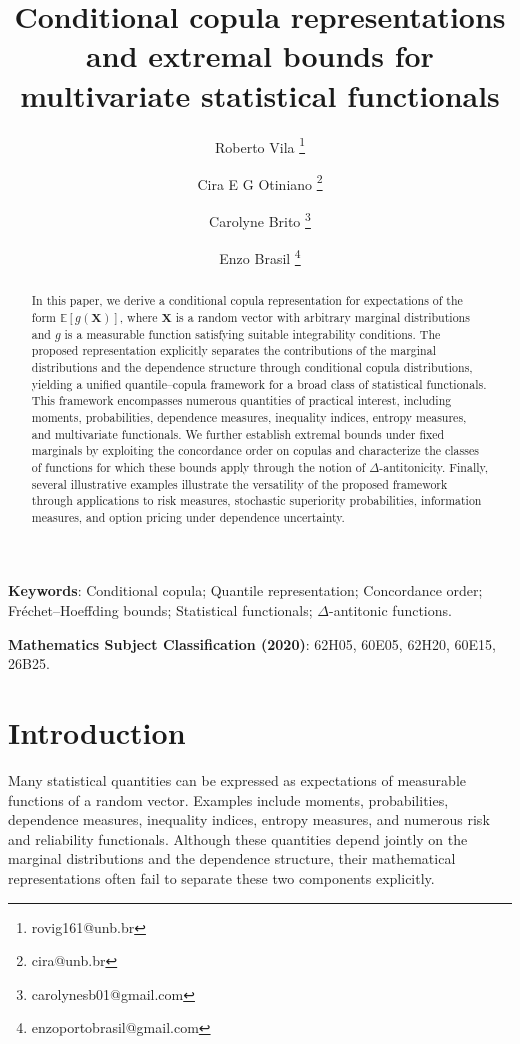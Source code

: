 \documentclass[12pt]{article}
\title{\bf Conditional copula representations and extremal bounds for multivariate statistical functionals}
\author[1] { Roberto Vila \thanks{rovig161@unb.br }}
\author[1]{Cira E G Otiniano \thanks{cira@unb.br }}
\author[1]{Carolyne Brito  \thanks{carolynesb01@gmail.com}}
\author[1]{Enzo Brasil  \thanks{enzoportobrasil@gmail.com}}
\affil[1]{\normalfont 
 	Department of Statistics, University of
 	Bras\'ilia, Bras\'ilia, 70.910-900, Brazil}
\begin{document}
\maketitle
\begin{abstract}
In this paper, we derive a conditional copula representation for expectations of the form $\mathbb{E}[g(\boldsymbol{X})]$, where $\boldsymbol{X}$ is a random vector with arbitrary marginal distributions and $g$ is a measurable function satisfying suitable integrability conditions. The proposed representation explicitly separates the contributions of the marginal distributions and the dependence structure through conditional copula distributions, yielding a unified quantile--copula framework for a broad class of statistical functionals. This framework encompasses numerous quantities of practical interest, including moments, probabilities, dependence measures, inequality indices, entropy measures, and multivariate functionals. We further establish extremal bounds under fixed marginals by exploiting the concordance order on copulas and characterize the classes of functions for which these bounds apply through the notion of $\Delta$-antitonicity. Finally, several illustrative examples illustrate the versatility of the proposed framework through applications to risk measures, stochastic superiority probabilities, information measures, and option pricing under dependence uncertainty.
\end{abstract}
\textbf{Keywords}: Conditional copula;
Quantile representation;
Concordance order;
Fréchet--Hoeffding bounds;
Statistical functionals;
$\Delta$-antitonic functions.

\noindent
\textbf{Mathematics Subject Classification (2020)}: 62H05,
60E05,
62H20,
60E15,
26B25.




\section{Introduction}

Many statistical quantities can be expressed as expectations of measurable functions of a random vector. Examples include moments, probabilities, dependence measures, inequality indices, entropy measures, and numerous risk and reliability functionals. Although these quantities depend jointly on the marginal distributions and the dependence structure, their mathematical representations often fail to separate these two components explicitly.
\end{document}
